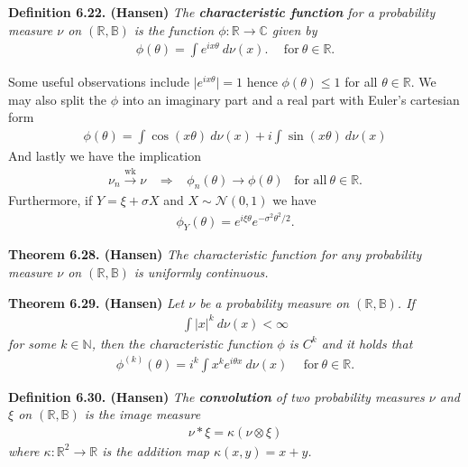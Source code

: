 \documentclass[a4paper,12pt,openany]{book}
\begin{document}
\textbf{Definition 6.22. (Hansen)} \emph{The \textbf{characteristic function} for a probability measure \(\nu\) on \((\mathbb{R},\mathbb{B})\) is the function \(\phi : \mathbb{R}\to \mathbb{C}\) given by}
\begin{align*}
    \phi(\theta)=\int e^{ix\theta}\ d\nu(x).\hspace{15pt}\text{for}\ \theta\in\mathbb{R}.\tag{6.23}
\end{align*}

Some useful observations include \(\vert e^{ix\theta}\vert = 1\) hence \(\phi(\theta)\le 1\) for all \(\theta\in\mathbb{R}\). We may also split the \(\phi\) into an imaginary part and a real part with Euler's cartesian form
\begin{align*}
    \phi(\theta)=\int \cos (x\theta)\ d\nu(x)+i\int \sin (x\theta)\ d\nu(x)\tag{6.24}
\end{align*}
And lastly we have the implication
\begin{align*}
    \nu_n\stackrel{\text{wk}}{\to} \nu \hspace{10pt}\Rightarrow\hspace{10pt} \phi_n(\theta)\to \phi(\theta)\hspace{10pt}\text{for all}\ \theta\in\mathbb{R}.
\end{align*}
Furthermore, if \(Y=\xi+\sigma X\) and \(X\sim \mathcal{N}(0,1)\) we have
\begin{align*}
    \phi_Y(\theta)=e^{i\xi\theta}e^{-\sigma^2\theta^2/2}.
\end{align*}

\textbf{Theorem 6.28. (Hansen)} \emph{The characteristic function for any probability measure \(\nu\) on \((\mathbb{R},\mathbb{B})\) is uniformly continuous.}

\textbf{Theorem 6.29. (Hansen)} \emph{Let \(\nu\) be a probability measure on \((\mathbb{R},\mathbb{B})\). If}
\begin{align*}
    \int \vert x\vert^k\ d\nu(x)<\infty
\end{align*}
\emph{for some \(k\in\mathbb{N}\), then the characteristic function \(\phi\) is \(C^k\) and it holds that}
\begin{align*}
    \phi^{(k)}(\theta)=i^k\int x^ke^{i\theta x}\ d\nu(x)\hspace{15pt}\text{for}\ \theta\in\mathbb{R}.\tag{6.31}
\end{align*}

\textbf{Definition 6.30. (Hansen)} \emph{The \textbf{convolution} of two probability measures \(\nu\) and \(\xi\) on \((\mathbb{R},\mathbb{B})\) is the image measure}
\begin{align*}
    \nu * \xi=\kappa (\nu\otimes\xi)\tag{6.33}
\end{align*}
\emph{where \(\kappa : \mathbb{R}^2\to\mathbb{R}\) is the addition map \(\kappa(x,y)=x+y\).}
\end{document}
